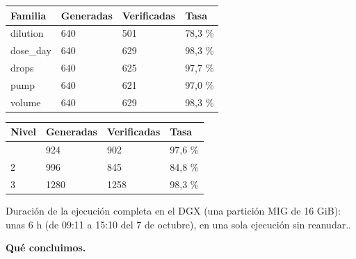 {\def\LTcaptype{none} %
\small\setlength{\tabcolsep}{3pt}
\begin{longtable}[]{@{}llll@{}}
\toprule\noalign{}
Familia & Generadas & Verificadas & Tasa \\
\midrule\noalign{}
\endhead
\bottomrule\noalign{}
\endlastfoot
dilution & 640 & 501 & 78,3 \% \\
dose\_\allowbreak{}day & 640 & 629 & 98,3 \% \\
drops & 640 & 625 & 97,7 \% \\
pump & 640 & 621 & 97,0 \% \\
volume & 640 & 629 & 98,3 \% \\
\end{longtable}
}

{\def\LTcaptype{none} %
\small\setlength{\tabcolsep}{3pt}
\begin{longtable}[]{@{}llll@{}}
\toprule\noalign{}
Nivel & Generadas & Verificadas & Tasa \\
\midrule\noalign{}
\endhead
\bottomrule\noalign{}
\endlastfoot
1 & 924 & 902 & 97,6 \% \\
2 & 996 & 845 & 84,8 \% \\
3 & 1280 & 1258 & 98,3 \% \\
\end{longtable}
}

Duración de la ejecución completa en el DGX (una partición MIG de 16 GiB): unas 6 h (de 09:11 a 15:10 del 7 de octubre), en una sola ejecución sin reanudar..

\textbf{Qué concluimos.}

